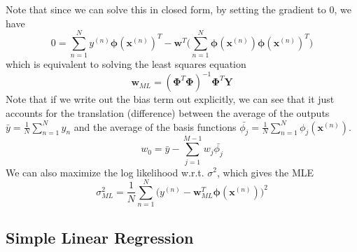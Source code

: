 \documentclass{article}
\theoremstyle{definition}
\begin{document}
  Note that since we can solve this in closed form, by setting the gradient to $0$, we have 
  \[0 = \sum_{n=1}^N y^{(n)} \boldsymbol{\phi}(\mathbf{x}^{(n)})^T - \mathbf{w}^T \bigg( \sum_{n=1}^N \boldsymbol{\phi}(\mathbf{x}^{(n)}) \boldsymbol{\phi}(\mathbf{x}^{(n)})^T \bigg)\]
  which is equivalent to solving the least squares equation 
  \[\mathbf{w}_{ML} = ( \boldsymbol{\Phi}^T \boldsymbol{\Phi})^{-1} \boldsymbol{\Phi}^T \mathbf{Y}\]
  Note that if we write out the bias term out explicitly, we can see that it just accounts for the translation (difference) between the average of the outputs $\bar{y} = \frac{1}{N} \sum_{n=1}^N y_n$ and the average of the basis functions $\bar{\phi_j} = \frac{1}{N} \sum_{n=1}^N \phi_j (\mathbf{x}^{(n)})$. 
  \[w_0 = \bar{y} - \sum_{j=1}^{M-1} w_j \bar{\phi_j}\]
  We can also maximize the log likelihood w.r.t. $\sigma^2$, which gives the MLE 
  \[\sigma^2_{ML} = \frac{1}{N} \sum_{n=1}^N \big( y^{(n)} - \mathbf{w}^T_{ML} \boldsymbol{\phi}(\mathbf{x}^{(n)}) \big)^2\]

  \subsection{Simple Linear Regression}
\end{document}
